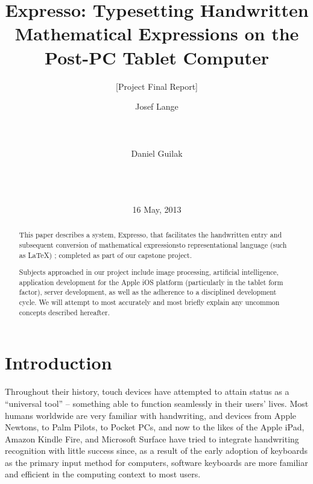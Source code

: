 \documentclass{acm_proc_article-sp}
\begin{document}
\title{ Expresso: Typesetting Handwritten Mathematical Expressions on the Post-PC Tablet Computer }
\subtitle{ [Project Final Report] }


\author{
\alignauthor
Josef Lange\\
       \\
       \\
       \\
\alignauthor       
Daniel Guilak\\
       \\
       \\
       \\
}
       
\date{16 May, 2013}

\maketitle

\begin{abstract}
This paper describes a system, Expresso, that facilitates the handwritten entry and subsequent conversion of mathematical expressionsto representational language (such as \LaTeX{}) ; completed as part of our capstone project.

Subjects approached in our project include image processing, artificial intelligence, application development for the Apple iOS platform (particularly in the tablet form factor), server development, as well as the adherence to a disciplined development cycle. We will attempt to most accurately and most briefly explain any uncommon concepts described hereafter.
\end{abstract}

\section{Introduction}
Throughout their history, touch devices have attempted to attain status as a ``universal tool'' -- something able to function seamlessly in their users' lives. Most humans worldwide are very familiar with handwriting, and devices from Apple Newtons, to Palm Pilots, to Pocket PCs, and now to the likes of the Apple iPad, Amazon Kindle Fire, and Microsoft Surface have tried to integrate handwriting recognition with little success since, as a result of the early adoption of keyboards as the primary input method for computers, software keyboards are more familiar and efficient in the computing context to most users.
\end{document}
